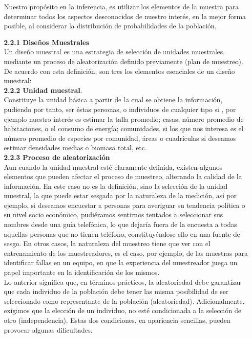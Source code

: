 \documentclass[base=hide,11pt]{elegantbook}
\begin{document}
Nuestro propósito en la inferencia, es utilizar los elementos de la muestra para determinar todos los aspectos desconocidos de nuestro interés, en la mejor forma posible, al considerar la distribución de probabilidades de la población.
	
	
\textcolor{col4}{\bf \large 2.2.1 Diseños Muestrales}\\
Un diseño muestral es una estrategia de selección de unidades muestrales, mediante un proceso de aleatorización definido previamente (plan de muestreo). De acuerdo con esta definición, son tres los elementos esenciales de un diseño muestral:\\


\textcolor{col4}{\bf \large 2.2.2 Unidad muestral}.\\
Constituye la unidad básica a partir de la cual se obtiene la información, pudiendo por tanto, ser éstas personas,  o individuos de cualquier tipo si , por ejemplo nuestro interés es estimar la talla promedio; casas, número promedio de habitaciones, o el consumo de energía; comunidades, si los que nos interesa es el número promedio de especies por comunidad, áreas o cuadrículas si deseamos estimar densidades medias o biomasa total, etc.\\

\textcolor{col4}{\bf \large 2.2.3 Proceso de aleatorización}\\
Aun cuando la unidad muestral esté claramente definida, existen algunos elementos que pueden afectar el proceso de muestreo, alterando la calidad de la información. En este caso no es la definición, sino la selección de la unidad muestral, la que puede estar sesgada por la naturaleza de la medición, así por ejemplo, si deseamos encuestar a personas para averiguar su tendencia política o su nivel socio económico, pudiéramos sentirnos tentados a seleccionar sus nombres desde una guía telefónica, lo que dejaría fuera de la encuesta a todas aquellas personas  que no tienen teléfono, constituyéndose ello en una fuente de sesgo. En  otros casos, la naturaleza del muestreo tiene que ver con el entrenamiento de los muestreadores, es el caso, por ejemplo, de las muestras para identificar fallas en un equipo, en que la experiencia del muestreador juega un papel importante en la identificación de los mismos.\\
		
Lo anterior significa que, en términos prácticos, la aleatoriedad debe garantizar que cada individuo de la población debe tener las misma posibilidad de ser seleccionado como representante de la población (aleatoriedad). Adicionalmente, exigimos que la elección de un individuo, no esté condicionada a la selección de otro (independencia). Estas dos condiciones, en apariencia sencillas, pueden provocar algunas  dificultades.\\
		
\end{document}
